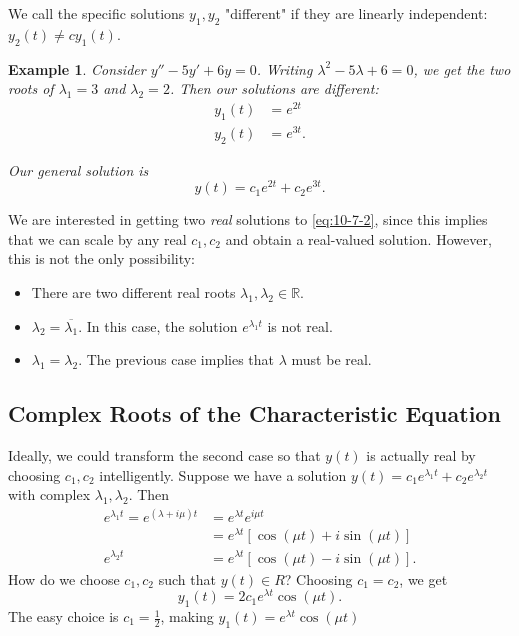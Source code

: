 \documentclass{tufte-handout}
\newcommand*\R{\mathbb{R}}
\newtheorem{ex}[thm]{Example}
\theoremstyle{definition}
\begin{document}
We call the specific solutions $y_1,y_2$ "different" if they are linearly independent: $y_2(t) \ne c y_1(t)$.

\begin{ex}
	Consider $y'' - 5y' + 6y = 0$. Writing $\lambda^2 - 5\lambda + 6 = 0$, we get the two roots of $\lambda_1 = 3$ and $\lambda_2 = 2$. Then our solutions are different:
	\begin{align*}
		y_1(t) &= e^{2t} \\
		y_2(t) &= e^{3t}
	.\end{align*}

	Our general solution is \[
		y(t) = c_1 e^{2t} + c_2 e^{3t}
	.\] 
\end{ex}

We are interested in getting two \emph{real} solutions to \ref{eq:10-7-2}, since this implies that we can scale by any real $c_1,c_2$ and obtain a real-valued solution. However, this is not the only possibility:
\begin{itemize}
	\item There are two different real roots $\lambda_1, \lambda_2 \in \R$.
	\item $\lambda_2 = \overline{\lambda_1}$. In this case, the solution $e^{\lambda_1 t}$ is not real.
	\item $\lambda_1 = \lambda_2$. The previous case implies that $\lambda$ must be real.
\end{itemize}

\subsection{Complex Roots of the Characteristic Equation}

Ideally, we could transform the second case so that $y(t)$ is actually real by choosing $c_1,c_2$ intelligently. 
Suppose we have a solution $y(t) = c_1e^{\lambda_1 t} + c_2 e^{\lambda_2 t}$ with complex $\lambda_1, \lambda_2$. Then 
\begin{align*}
	e^{\lambda_1 t} = e^{\left( \lambda + i \mu \right)t} &= e^{\lambda t} e^{i \mu t} \\
	&= e^{\lambda t} \left[ \cos{(\mu t)} + i \sin{(\mu t)} \right]  \\
	e^{\lambda_2 t} &= e^{\lambda t } \left[ \cos{(\mu t)} - i \sin{(\mu t)} \right] 
.\end{align*}
How do we choose $c_1, c_2$ such that $y(t) \in R$? Choosing $c_1 = c_2$, we get \[
	y_1(t) = 2c_1 e^{\lambda t} \cos{(\mu t)}	
.\] The easy choice is $c_1 = \frac{1}{2}$, making $y_1(t) = e^{\lambda t} \cos{(\mu t)}$
\end{document}
